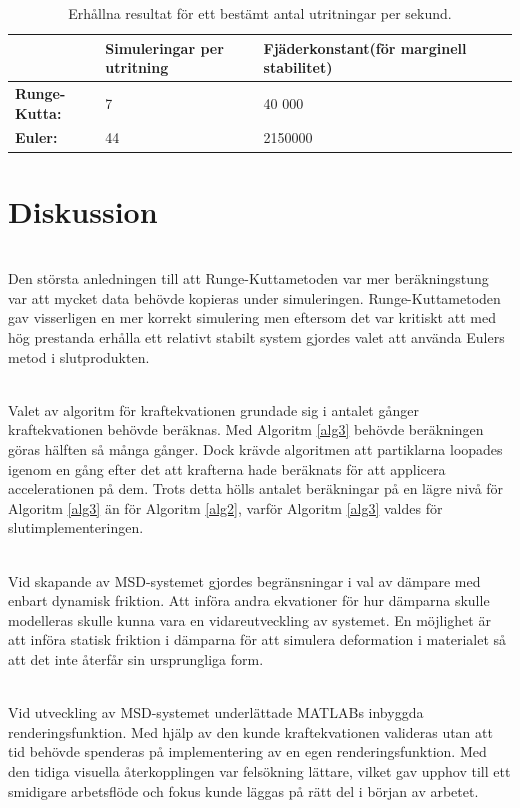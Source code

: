 \documentclass[a4paper,12pt,oneside,final,swedish]{extarticle}
\begin{document}
\begin{table}[htbp]
    \caption{Erhållna resultat för ett bestämt antal utritningar per sekund.}
    \label{table_example2}
    \begin{tabular*}{\hsize}{lllll}
      \hline %
       & \bfseries Simuleringar per utritning & \bfseries Fjäderkonstant(för marginell stabilitet)\\
      \hline
      \bfseries Runge-Kutta: & 7 & 40 000\\
      \bfseries Euler: & 44 & 2150000\\
      \hline
    \end{tabular*}
\end{table}
\pagebreak
\section{Diskussion}
\noindent\\Den största anledningen till att Runge-Kuttametoden var mer beräkningstung var att mycket data behövde kopieras under simuleringen. Runge-Kuttametoden gav visserligen en mer korrekt simulering men eftersom det var kritiskt att med hög prestanda erhålla ett relativt stabilt system gjordes valet att använda Eulers metod i slutprodukten.

\noindent\\Valet av algoritm för kraftekvationen grundade sig i antalet gånger kraftekvationen behövde beräknas. Med Algoritm \ref{alg3} behövde beräkningen göras hälften så många gånger. Dock krävde algoritmen att partiklarna loopades igenom en gång efter det att krafterna hade beräknats för att applicera accelerationen på dem. Trots detta hölls antalet beräkningar på en lägre nivå för Algoritm \ref{alg3} än för Algoritm \ref{alg2}, varför Algoritm \ref{alg3} valdes för slutimplementeringen.

\noindent\\Vid skapande av MSD-systemet gjordes begränsningar i val av dämpare med enbart dynamisk friktion. Att införa andra ekvationer för hur dämparna skulle modelleras skulle kunna vara en vidareutveckling av systemet. En möjlighet är att införa statisk friktion i dämparna för att simulera deformation i materialet så att det inte återfår sin ursprungliga form.

\noindent\\Vid utveckling av MSD-systemet underlättade MATLABs inbyggda renderingsfunktion. Med hjälp av den kunde kraftekvationen valideras utan att tid behövde spenderas på implementering av en egen renderingsfunktion. Med den tidiga visuella återkopplingen var felsökning lättare, vilket gav upphov till ett smidigare arbetsflöde och fokus kunde läggas på rätt del i början av arbetet.
\end{document}
